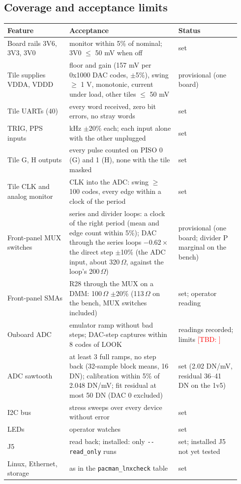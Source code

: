 \documentclass[11pt]{article}
\newcommand{\tbd}[1]{\textcolor{red}{[TBD: #1]}}
\newcommand{\opt}[1]{\texttt{-{}-#1}}
\begin{document}
\subsection{Coverage and acceptance limits}

\begin{longtable}{@{}>{\raggedright\arraybackslash}p{0.25\linewidth}>{\raggedright\arraybackslash}p{0.44\linewidth}>{\raggedright\arraybackslash}p{0.25\linewidth}@{}}
\toprule
Feature & Acceptance & Status \\
\midrule
\endhead
Board rails 3V6, 3V3, 3V0 & monitor within 5\% of nominal; 3V0 $\le$ 50 mV when off & set \\
Tile supplies VDDA, VDDD & floor and gain (157 mV per 0x1000 DAC codes, $\pm$5\%), swing $\ge$ 1 V, monotonic,
  current under load, other tiles $\le$ 50 mV & provisional (one board) \\
Tile UARTs (40) & every word received, zero bit errors, no stray words & set \\
TRIG, PPS inputs & 1 kHz $\pm$20\% each; each input alone with the other unplugged & set \\
Tile G, H outputs & every pulse counted on PISO 0 (G) and 1 (H), none with the tile masked & set \\
Tile CLK and analog monitor & CLK into the ADC: swing $\ge$ 100 codes, every edge within a clock of the period & set \\
Front-panel MUX switches & series and divider loops: a clock of the right period (mean and edge count within
  5\%); DAC through the series loops $-0.62\times$ the direct step $\pm$10\% (the ADC input, about
  320\,$\Omega$, against the loop's 200\,$\Omega$) & provisional (one board; divider P marginal on the bench) \\
Front-panel SMAs & R28 through the MUX on a DMM: 100\,$\Omega$ $\pm$20\% (113\,$\Omega$ on the bench, MUX
  switches included) & set; operator reading \\
Onboard ADC & emulator ramp without bad steps; DAC-step captures within 8 codes of LOOK & readings recorded;
  limits \tbd{} \\
ADC sawtooth & at least 3 full ramps, no step back (32-sample block means, 16 DN);  calibration within 5\% of
  2.048 DN/mV;  fit residual at most 50 DN (DAC 0 excluded) & set (2.02 DN/mV, residual 36--41 DN on the 1v5) \\
I2C bus & stress sweeps over every device without error & set \\
LEDs & operator watches & set \\
J5 & read back; installed: only \opt{read\_only} runs & set; installed J5 not yet tested \\
Linux, Ethernet, storage & as in the \texttt{pacman\_lnxcheck} table & set \\
\bottomrule
\end{longtable}
\end{document}
